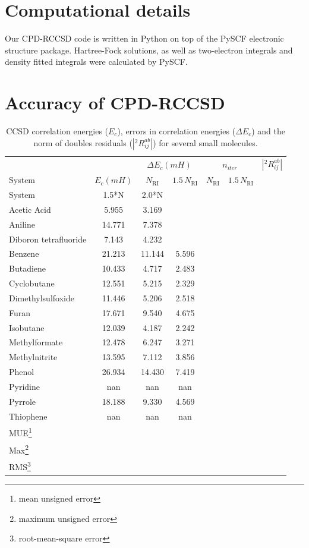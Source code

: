 \section{Computational details}
Our CPD-RCCSD code is written in Python\cite{van2007python} on top of the 
PySCF\cite{sun2017python} electronic structure package. Hartree-Fock solutions, 
as well as two-electron integrals and density fitted integrals were calculated 
by PySCF. 

\section{Accuracy of CPD-RCCSD}


\begin{center}
\begin{table}[h]
\caption{CCSD correlation energies ($E_c$), errors in
correlation energies ($\Delta E_c$)
and the norm of doubles residuals ($|{}^2R_{ij}^{ab}|$) for several small 
molecules.
\label{tab:energies_cpd_rccsd}}
\begin{tabular}{lccccccc}
\hline \hline
& & \multicolumn{2}{c}{$\Delta E_c (mH)$} & \multicolumn{2}{c}{$n_{iter}$} & 
\multicolumn{2}{c}{$|{}^2R_{ij}^{ab}|$}\\
\cline{3-4} \cline{5-6} \cline{7-8} System & $E_c (mH)$ & $N_\mathrm{RI}$ &
$1.5 \, N_\mathrm{RI}$ & $N_\mathrm{RI}$ &
$1.5 \, N_\mathrm{RI}$ \\
\hline
System & 1.5*N & 2.0*N  \\
Acetic Acid & 5.955 & 3.169 \\
Aniline & 14.771 & 7.378  \\
Diboron tetrafluoride & 7.143 & 4.232 \\
Benzene & 21.213 & 11.144 & 5.596 \\
Butadiene & 10.433 & 4.717 & 2.483 \\
Cyclobutane & 12.551 & 5.215 & 2.329 \\
Dimethylsulfoxide & 11.446 & 5.206 & 2.518 \\
Furan & 17.671 & 9.540 & 4.675 \\
Isobutane & 12.039 & 4.187 & 2.242 \\
Methylformate & 12.478 & 6.247 & 3.271 \\
Methylnitrite & 13.595 & 7.112 & 3.856 \\
Phenol & 26.934 & 14.430 & 7.419 \\
Pyridine & nan & nan & nan \\
Pyrrole & 18.188 & 9.330 & 4.569 \\
Thiophene & nan & nan & nan \\\hline
MUE\footnote{mean unsigned error} & & & & &\\
Max\footnote{maximum unsigned error} & & & & &\\
RMS\footnote{root-mean-square error} & & & & &\\
\hline\hline
\end{tabular}
\end{table}

\end{center}


